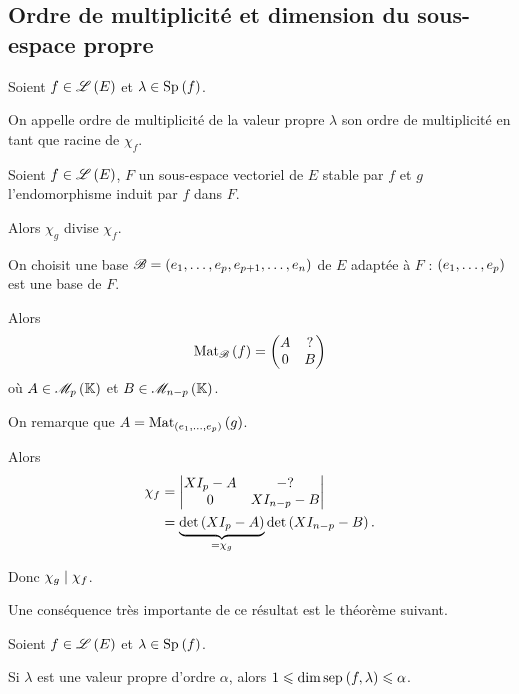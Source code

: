 \subsection{Ordre de multiplicité et dimension du sous-espace propre}

\begin{defi}
Soient \(f\in\mathscr{L}\left(E\right)\) et \(\lambda\in\Sp{f}\).

On appelle ordre de multiplicité de la valeur propre \(\lambda\) son ordre de multiplicité en tant que racine de \(\chi_f\).
\end{defi}

\begin{prop}
Soient \(f\in\mathscr{L}\left(E\right)\), \(F\) un sous-espace vectoriel de \(E\) stable par \(f\) et \(g\) l'endomorphisme induit par \(f\) dans \(F\).

Alors \(\chi_g\) divise \(\chi_f\).
\end{prop}

\begin{dem}
On choisit une base \(\mathscr{B}=\left(e_1,\dots,e_p,e_{p+1},\dots,e_n\right)\) de \(E\) adaptée à \(F\) : \(\left(e_1,\dots,e_p\right)\) est une base de \(F\).

Alors \[\Mat{f}=\begin{pmatrix}
A & ? \\
0 & B
\end{pmatrix}\] où \(A\in\M{p}\) et \(B\in\M{n-p}\).

On remarque que \(A=\Mat[\paren{e_1,\dots,e_p}]{g}\).

Alors \[\begin{aligned}
\chi_f&=\begin{vmatrix}
XI_p-A & -? \\
0 & XI_{n-p}-B
\end{vmatrix} \\
&=\underbrace{\det\left(XI_p-A\right)}_{=\chi_g}\det\left(XI_{n-p}-B\right).
\end{aligned}\]

Donc \(\chi_g\mid\chi_f\).
\end{dem}

Une conséquence très importante de ce résultat est le théorème suivant.

\begin{theo}
Soient \(f\in\mathscr{L}\left(E\right)\) et \(\lambda\in\Sp{f}\).

Si \(\lambda\) est une valeur propre d'ordre \(\alpha\), alors \(1\leq\dim\sep{f}{\lambda}\leq\alpha\).
\end{theo}

